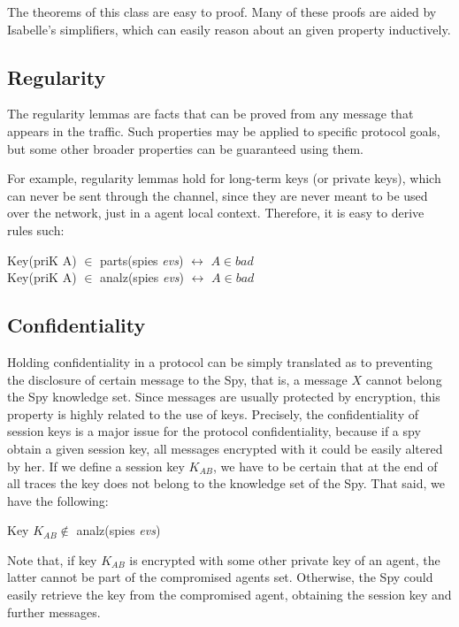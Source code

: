 The theorems of this class are easy to proof. Many of these proofs are aided by Isabelle's simplifiers, which can easily reason about an given property inductively.

\subsection{Regularity}
The regularity lemmas are facts that can be proved from any message that appears in the traffic. Such properties may be applied to specific protocol goals, but some other broader properties can be guaranteed using them.

For example, regularity lemmas hold for long-term keys (or private keys), which can never be sent through the channel, since they are never meant to be used over the network, just in a agent local context. Therefore, it is easy to derive rules such:

\begin{center}
  Key(priK A) $\in$ parts(spies \textit{evs}) $\leftrightarrow$ $A \in bad$ \\
  Key(priK A) $\in$ analz(spies \textit{evs}) $\leftrightarrow$ $A \in bad$
\end{center}

\subsection{Confidentiality}
Holding confidentiality in a protocol can be simply translated as to preventing the disclosure of certain message to the Spy, that is, a message $X$ cannot belong the Spy knowledge set. Since messages are usually protected by encryption, this property is highly related to the use of keys. Precisely, the confidentiality of session keys is a major issue for the protocol confidentiality, because if a spy obtain a given session key, all messages encrypted with it could be easily altered by her. If we define a session key $K_{AB}$, we have to be certain that at the end of all traces the key does not belong to the knowledge set of the Spy. That said, we have the following:

\begin{center}
  Key $K_{AB} \notin$ analz(spies \textit{evs})
\end{center}

Note that, if key $K_{AB}$ is encrypted with some other private key of an agent, the latter cannot be part of the compromised agents set. Otherwise, the Spy could easily retrieve the key from the compromised agent, obtaining the session key and further messages.

